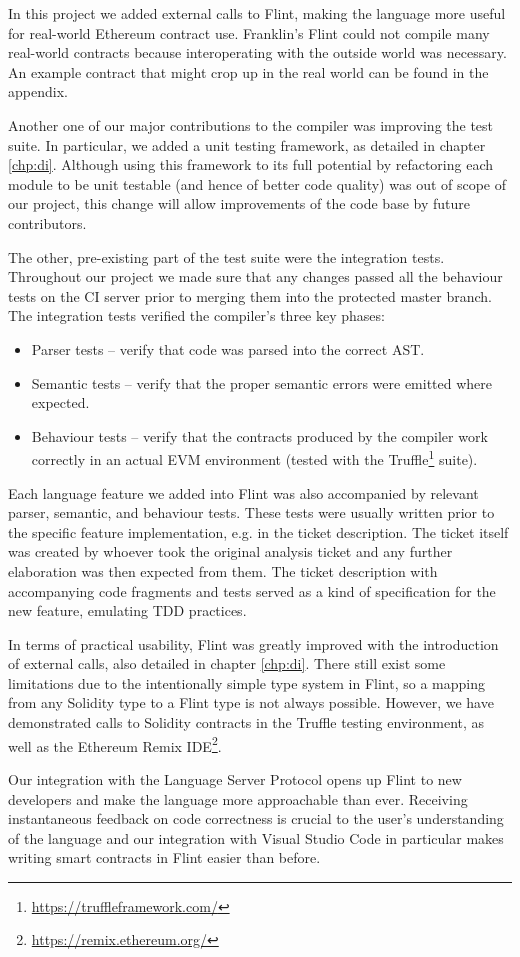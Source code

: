 In this project we added external calls to Flint, making the language more useful for real-world Ethereum contract use. Franklin's Flint could not compile many real-world contracts because interoperating with the outside world was necessary. An example contract that might crop up in the real world can be found in the appendix.

Another one of our major contributions to the compiler was improving the test suite. In particular, we added a unit testing framework, as detailed in chapter \ref{chp:di}. Although using this framework to its full potential by refactoring each module to be unit testable (and hence of better code quality) was out of scope of our project, this change will allow improvements of the code base by future contributors.

The other, pre-existing part of the test suite were the integration tests. Throughout our project we made sure that any changes passed all the behaviour tests on the CI server prior to merging them into the protected master branch. The integration tests verified the compiler’s three key phases:

\begin{itemize}
	\item Parser tests – verify that code was parsed into the correct AST.
	\item Semantic tests – verify that the proper semantic errors were emitted where expected.
	\item Behaviour tests – verify that the contracts produced by the compiler work correctly in an actual EVM environment (tested with the Truffle\footnote{\url{https://truffleframework.com/}} suite).
\end{itemize}

Each language feature we added into Flint was also accompanied by relevant parser, semantic, and behaviour tests. These tests were usually written prior to the specific feature implementation, e.g. in the ticket description. The ticket itself was created by whoever took the original analysis ticket and any further elaboration was then expected from them. The ticket description with accompanying code fragments and tests served as a kind of specification for the new feature, emulating TDD practices.

In terms of practical usability, Flint was greatly improved with the introduction of external calls, also detailed in chapter \ref{chp:di}. There still exist some limitations due to the intentionally simple type system in Flint, so a mapping from any Solidity type to a Flint type is not always possible. However, we have demonstrated calls to Solidity contracts in the Truffle testing environment, as well as the Ethereum Remix IDE\footnote{\url{https://remix.ethereum.org/}}.

Our integration with the Language Server Protocol opens up Flint to new developers and make the language more approachable than ever. Receiving instantaneous feedback on code correctness is crucial to the user’s understanding of the language and our integration with Visual Studio Code in particular makes writing smart contracts in Flint easier than before.
